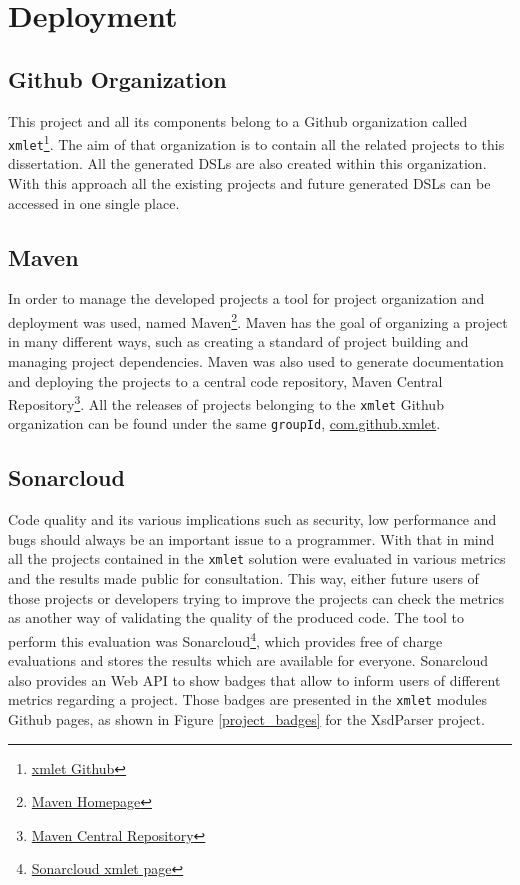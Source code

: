 \chapter{Deployment}
\label{cha:deployment}

\section{Github Organization} %
\label{sec:github}

This project and all its components belong to a Github organization called \texttt{xmlet}\footnote{\href{https://github.com/xmlet}{xmlet Github}}. The aim of that organization is to contain all the related projects to this dissertation. All the generated \ac{DSL}s are also created within this organization. With this approach all the existing projects and future generated \ac{DSL}s can be accessed in one single place.

\section{Maven} %
\label{sec:maven}

In order to manage the developed projects a tool for project organization and deployment was used, named Maven\footnote{\href{https://maven.apache.org/}{Maven Homepage}}. Maven has the goal of organizing a project in many different ways, such as creating a standard of project building and managing project dependencies. Maven was also used to generate documentation and deploying the projects to a central code repository, Maven Central Repository\footnote{\href{https://search.maven.org/}{Maven Central Repository}}. All the releases of projects belonging to the \texttt{xmlet} Github organization can be found under the same \texttt{groupId}, \href{https://search.maven.org/#search%7Cga%7C1%7Ccom.github.xmlet}{com.github.xmlet}. 

\section{Sonarcloud} %
\label{sec:sonarcloud}


Code quality and its various implications such as security, low performance and bugs should always be an important issue to a programmer. With that in mind all the projects contained in the \texttt{xmlet} solution were evaluated in various metrics and the results made public for consultation. This way, either future users of those projects or developers trying to improve the projects can check the metrics as another way of validating the quality of the produced code. The tool to perform this evaluation was Sonarcloud\footnote{\href{https://sonarcloud.io/organizations/xmlet/projects}{Sonarcloud xmlet page}}, which provides free of charge evaluations and stores the results which are available for everyone. Sonarcloud also provides an Web \ac{API} to show badges that allow to inform users of different metrics regarding a project. Those badges are presented in the \texttt{xmlet} modules Github pages, as shown in Figure \ref{project_badges} for the XsdParser project.

